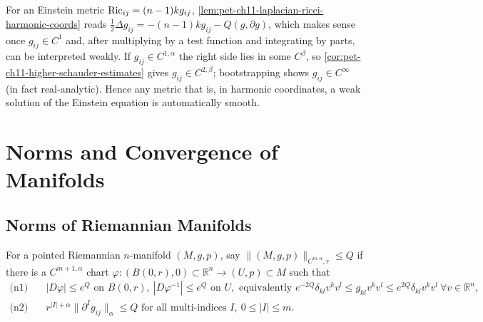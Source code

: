 \begin{remark}
  \label{rem:pet-ch11-einstein-harmonic-regularity-bootstrap}
  For an Einstein metric $\operatorname{Ric}_{ij}=(n-1)kg_{ij}$,
  \cref{lem:pet-ch11-laplacian-ricci-harmonic-coords} reads
  $\tfrac12\Delta g_{ij}=-(n-1)kg_{ij}-Q(g,\partial g)$, which makes sense
  once $g_{ij}\in C^1$ and, after multiplying by a test function and
  integrating by parts, can be interpreted weakly. If $g_{ij}\in C^{1,\alpha}$
  the right side lies in some $C^\beta$, so \cref{cor:pet-ch11-higher-schauder-estimates}
  gives $g_{ij}\in C^{2,\beta}$; bootstrapping shows $g_{ij}\in C^\infty$
  (in fact real-analytic). Hence any metric that is, in harmonic coordinates,
  a weak solution of the Einstein equation is automatically smooth.
\end{remark}

\section{Norms and Convergence of Manifolds}

\subsection{Norms of Riemannian Manifolds}

\begin{definition}
  \label{def:pet-ch11-cmalpha-norm-pointed}
  For a pointed Riemannian $n$-manifold $(M,g,p)$, say
  $\|(M,g,p)\|_{C^{m,\alpha},r}\le Q$ if there is a $C^{m+1,\alpha}$ chart
  $\varphi:(B(0,r),0)\subset\mathbb{R}^n\to(U,p)\subset M$ such that
  \begin{align}
    \text{(n1)}\quad&|D\varphi|\le e^Q\text{ on }B(0,r),\ |D\varphi^{-1}|\le e^Q\text{ on }U,
    \text{ equivalently }e^{-2Q}\delta_{kl}v^kv^l\le g_{kl}v^kv^l\le e^{2Q}\delta_{kl}v^kv^l\ \forall v\in\mathbb{R}^n,\\
    \text{(n2)}\quad&r^{|I|+\alpha}\|\partial^Ig_{ij}\|_\alpha\le Q\text{ for all multi-indices }I,\ 0\le|I|\le m.
  \end{align}
\end{definition}

